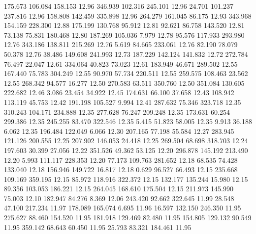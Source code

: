  175.673  106.084  158.153        12.96
 346.939  102.316  245.101        12.96
  24.701  101.237  237.816        12.96
 158.808  142.459  335.898        12.96
 264.279  161.045   86.175        12.93
 343.968  154.159  228.300        12.88
 175.199  130.768   95.912        12.81
  92.621   86.758  143.520        12.81
  73.138   75.831  180.468        12.80
 187.269  105.036    7.979        12.78
  95.576  117.933  293.980        12.76
 343.186  138.811  215.269        12.76
   5.619   84.665  233.061        12.76
  82.190   78.079   50.378        12.76
  38.486  149.608  241.993        12.73
 187.229  142.124  141.832        12.72
 272.784   76.497   22.047        12.61
 334.064   40.823   73.023        12.61
 183.949   46.671  289.502        12.55
 167.440   75.783  304.249        12.55
  90.970   57.734  220.511        12.55
 259.575  108.463   23.562        12.55
 268.342   94.577   16.277        12.50
 270.583   63.511  350.760        12.50
 351.084  130.605  222.682        12.46
   3.086   23.454   34.922        12.45
 174.631   66.100   37.658        12.43
 108.942  113.119   45.753        12.42
 191.198  105.527    9.994        12.41
 287.632   75.346  323.718        12.35
 310.243  104.171  234.888        12.35
 277.628   76.247  209.248        12.35
 173.631   60.254  299.386        12.35
 245.255   83.470  322.546        12.35
   5.415   51.823   58.005        12.35
   9.913   36.188    6.062        12.35
 196.484  122.049    6.066        12.30
 207.165   77.198   55.584        12.27
 283.945  121.126  200.555        12.25
 207.902  146.053   24.418        12.25
 269.504   68.698  318.703        12.24
 197.603   30.399   27.056        12.22
 351.526   49.362   53.125        12.20
 296.878  145.192  213.490        12.20
   5.993  111.117  228.353        12.20
  77.173  109.763  281.652        12.18
  68.535   74.428  133.040        12.18
 156.946  149.722   16.817        12.18
   0.629   96.527   66.493        12.15
 235.668  109.169  359.195        12.15
  85.972  118.916  322.372        12.15
 132.177  135.244   15.980        12.15
  89.356  103.053  186.221        12.15
 264.045  168.610  175.504        12.15
 211.973  145.990   75.003        12.10
 182.947   84.276    8.369        12.06
 243.420   92.662  322.645        11.99
  28.548   47.100  217.234        11.97
 178.089  165.074    6.695        11.96
  16.597  132.150  246.350        11.95
 275.627   88.460  154.520        11.95
 181.918  129.469   82.480        11.95
 154.805  129.132   90.549        11.95
 359.142   68.643   60.450        11.95
  25.793   83.321  184.461        11.95
